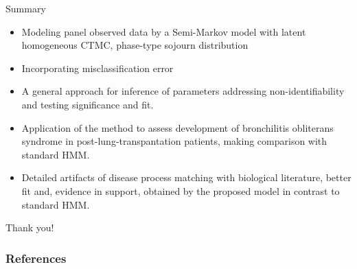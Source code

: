 \documentclass{beamer}
\begin{document}
 \begin{frame}{Summary}
\begin{itemize}
\item Modeling panel observed data by a Semi-Markov model with latent homogeneous CTMC, phase-type sojourn distribution
\item Incorporating misclassification error
\item A general approach for inference of parameters addressing non-identifiability and testing significance and fit.
\item Application of the method to assess development of bronchilitis obliterans syndrome in post-lung-transpantation patients, making comparison with standard HMM.
\item Detailed artifacts of disease process matching with biological literature, better fit and, evidence in support, obtained by the proposed model in contrast to standard HMM.
\end{itemize}
\end{frame}
\begin{frame}
\begin{center}
\Huge Thank you!
\end{center}
\end{frame}
\begin{frame}[allowframebreaks]
\frametitle{References}
 

\end{frame}
\end{document}
